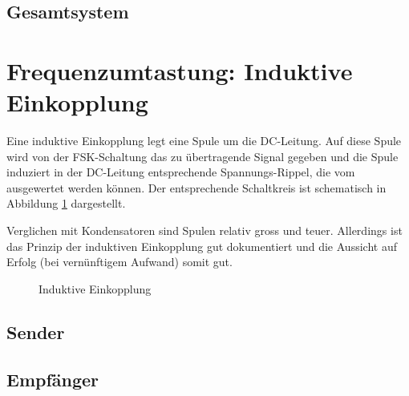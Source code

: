 \subsection{Gesamtsystem}
\label{sec:simu:fsk:capacitive:system}

\section{Frequenzumtastung: Induktive Einkopplung}
\label{sec:simu:fsk:inductive}

Eine induktive Einkopplung legt eine  Spule um die DC-Leitung. Auf diese Spule
wird von der FSK-Schaltung das zu  \"ubertragende Signal gegeben und die Spule
induziert in  der DC-Leitung  entsprechende Spannungs-Rippel, die  vom \Master
ausgewertet werden k\"onnen. Der entsprechende  Schaltkreis ist schematisch in
Abbildung \ref{fig:circ:coupling:inductive} dargestellt.

Verglichen mit  Kondensatoren sind Spulen relativ  gross und teuer. Allerdings
ist das Prinzip  der induktiven Einkopplung gut dokumentiert  und die Aussicht
auf Erfolg (bei vern\"unftigem Aufwand) somit gut.

\begin{figure}[h!tb]
    \centering
    
    \caption{Induktive Einkopplung}
    \label{fig:circ:coupling:inductive}
\end{figure}

\subsection{Sender}
\label{sec:simu:fsk:inductive:transmitter}

\subsection{Empf\"anger}
\label{sec:simu:fsk:inductive:receiver}

